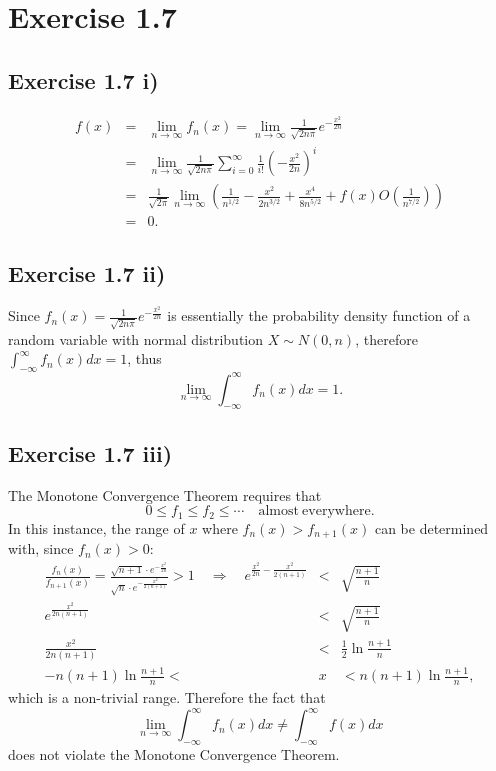 \documentclass[final,3p,authoryear]{elsarticle}
\begin{document}
\section{Exercise 1.7}
	\subsection{Exercise 1.7 i)}
		\begin{eqnarray}
			f(x) &=& \lim\limits_{n \to \infty} f_n(x) = \lim\limits_{n \to \infty} \frac{1}{\sqrt{2n\pi}} e^{-\frac{x^2}{2n}}
			\nonumber\\
			&=& \lim\limits_{n \to \infty} \frac{1}{\sqrt{2n\pi}} \sum\limits_{i=0}^{\infty} \frac{1}{i!} \left( -\frac{x^2}{2n} \right)^i
			\nonumber\\
			&=& \frac{1}{\sqrt{2\pi}} \lim\limits_{n \to \infty} \left( \frac{1}{n^{1/2}} - \frac{x^2}{2n^{3/2}} + \frac{x^4}{8n^{5/2}} + f(x)O(\frac{1}{n^{7/2}}) \right)
			\nonumber\\
			&=& 0
			.
		\end{eqnarray}
		
	\subsection{Exercise 1.7 ii)}
		Since $f_n(x)=\frac{1}{\sqrt{2n\pi}} e^{-\frac{x^2}{2n}}$ is essentially the probability density function of a random variable with normal distribution $X \sim N(0,n)$, therefore $\int_{-\infty}^{\infty} f_n(x) dx = 1$, thus
		\begin{equation}
			\lim\limits_{n \to \infty} \int_{-\infty}^{\infty} f_n(x) dx = 1
			.
		\end{equation}
		
	\subsection{Exercise 1.7 iii)}
		The Monotone Convergence Theorem requires that
		\begin{equation}
			0 \leq f_1 \leq f_2 \leq \cdots \quad \mathrm{almost~everywhere}
			.
		\end{equation}
		In this instance, the range of $x$ where $f_n(x)>f_{n+1}(x)$ can be determined with, since $f_n(x)>0$:
		\begin{eqnarray}
			\frac{f_n(x)}{f_{n+1}(x)} = \frac{\sqrt{n+1} \cdot e^{-\frac{x^2}{2n}}}{\sqrt{n} \cdot e^{-\frac{x^2}{2(n+1)}}} > 1
			\quad\Rightarrow\quad
			e^{\frac{x^2}{2n}-\frac{x^2}{2(n+1)}} &<& \sqrt{\frac{n + 1}{n}}
			\nonumber\\
			e^{\frac{x^2}{2n(n+1)}} &<& \sqrt{\frac{n + 1}{n}}
			\nonumber\\
			\frac{x^2}{2n(n+1)} &<& \frac{1}{2} \ln{\frac{n + 1}{n}}
			\nonumber\\
			-n(n+1)\ln{\frac{n + 1}{n}} < &x& < n(n+1)\ln{\frac{n + 1}{n}}
			,
		\end{eqnarray}
		which is a non-trivial range. Therefore the fact that
		\begin{equation*}
			\lim\limits_{n \to \infty} \int_{-\infty}^{\infty} f_n(x) dx \neq \int_{-\infty}^{\infty} f(x) dx
		\end{equation*}
		does not violate the Monotone Convergence Theorem.
	
\end{document}
